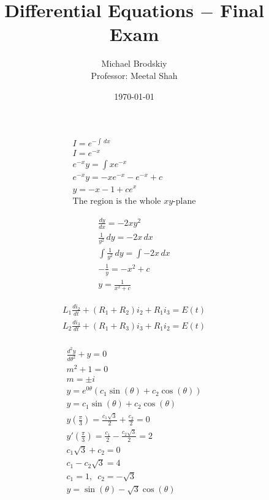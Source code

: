 \documentclass[12pt]{article}
\title{Differential Equations $-$ Final Exam}
\date{\today}
\author{Michael Brodskiy\\ \small Professor: Meetal Shah}
\begin{document}
\maketitle

\hline
\begin{equation}
  \begin{split}
    I=e^{-\int\,dx}\\
    I=e^{-x}\\
    e^{-x}y=\int xe^{-x}\\
    e^{-x}y=-xe^{-x}-e^{-x}+c\\
    y=-x-1+ce^{x}\\
    \text{The region is the whole $xy$-plane}
  \end{split}
  \label{1}
\end{equation}
\hline

\begin{equation}
  \begin{split}
    \frac{dy}{dx}=-2xy^2\\
    \frac{1}{y^2}\,dy=-2x\,dx\\
    \int\frac{1}{y^2}\,dy=\int-2x\,dx\\
    -\frac{1}{y}=-x^2+c\\
    y=\frac{1}{x^2+c}
  \end{split}
  \label{2}
\end{equation}

\hline
\begin{equation}
  \begin{split}
    L_1\frac{di_2}{dt}+(R_1+R_2)i_2+R_1i_3=E(t)\\
    L_2\frac{di_3}{dt}+(R_1+R_3)i_3+R_1i_2=E(t)\\
  \end{split}
  \label{3}
\end{equation}

\hline
\begin{equation}
  \begin{split}
    \frac{d^2y}{d\theta^2}+y=0\\
    m^2+1=0\\
    m=\pm i\\
    y=e^{0\theta}\left( c_1\sin\left( \theta \right)+c_2\cos\left( \theta \right) \right)\\
    y= c_1\sin\left( \theta \right)+c_2\cos\left( \theta \right)\\
    y\left( \frac{\pi}{3} \right)=\frac{c_1\sqrt{3}}{2}+\frac{c_2}{2}=0\\
    y'\left( \frac{\pi}{3} \right)=\frac{c_1}{2}-\frac{c_2\sqrt{3}}{2}=2\\
    c_1\sqrt{3}+c_2=0\\
    c_1-c_2\sqrt{3}=4\\
    c_1=1,\,\,\,c_2=-\sqrt{3}\\
    y=\sin(\theta)-\sqrt{3}\cos(\theta)\\
  \end{split}
  \label{4}
\end{equation}
\end{document}
